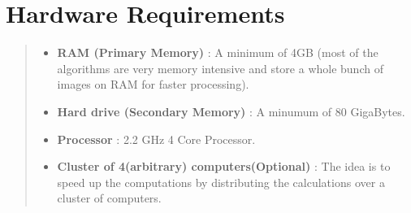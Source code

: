 \section*{Hardware Requirements}
\begin{quote}
\begin{itemize}
\item \textbf{RAM (Primary Memory)} : A minimum of 4GB (most of the algorithms are very memory intensive and store a whole bunch of images on RAM for faster processing).
\item \textbf{Hard drive (Secondary Memory)} : A minumum of 80 GigaBytes.
\item \textbf{Processor} : 2.2 GHz 4 Core Processor.
\item \textbf{Cluster of 4(arbitrary) computers(Optional)} : The idea is to speed up the computations by distributing the calculations over a cluster of computers.
\end{itemize}
\end{quote}

